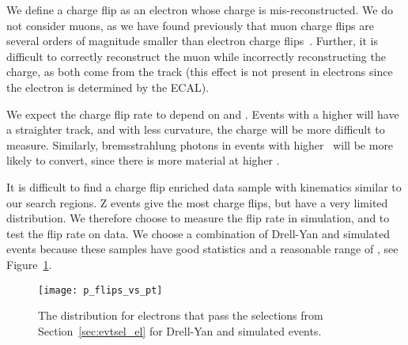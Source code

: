 We define a charge flip as an electron whose charge is mis-reconstructed.
We do not consider muons, as we have found previously that muon charge
flips are several orders of magnitude smaller than electron charge
flips~\cite{an_ss2010}. Further, it is difficult to correctly reconstruct
the muon \pt while incorrectly reconstructing the charge, as both come from
the track (this effect is not present in electrons since the electron \pt is
determined by the ECAL).

We expect the charge flip rate to depend on \pt and \aeta. Events with a higher
\pt will have a straighter track, and with less curvature, the charge will be
more difficult to measure. Similarly, bremsstrahlung photons in events with
higher \aeta~will be more likely to convert, since there is more material at
higher \aeta.
 
It is difficult to find a charge flip enriched data sample with kinematics
similar to our search regions. Z events give the most charge flips, but
have a very limited \pt distribution. We therefore choose to measure
the flip rate in simulation, and to test the flip rate on data. We
choose a combination of Drell-Yan and \ttbar simulated events because
these samples have good statistics and a reasonable range of \pt, see
Figure~\ref{fig:bkgd_flips_vs_pt}.

\begin{figure}[!hbt]
\begin{center}
\texttt{[image: p\_flips\_vs\_pt]}
\caption[The \pt distribution for electrons that pass the analysis selections]
{\label{fig:bkgd_flips_vs_pt}
The \pt distribution for electrons that pass the selections from
Section~\ref{sec:evtsel_el} for Drell-Yan and \ttbar simulated events.
}
\end{center}
\end{figure}

